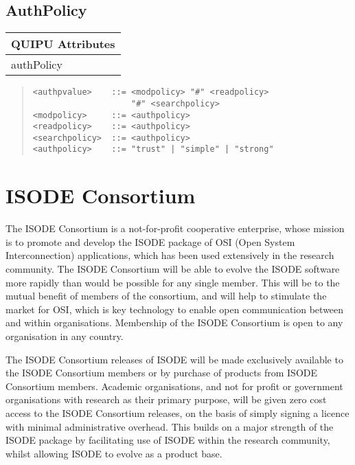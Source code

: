 \section{AuthPolicy}
\label{authpolicy}
\begin{center}\small
\begin{tabular}{|l|}\hline
QUIPU Attributes \\ \hline
	authPolicy\\
\hline
\end{tabular}
\end{center}
\begin{quote}\begin{verbatim}
<authpvalue>    ::= <modpolicy> "#" <readpolicy> 
                    "#" <searchpolicy>
<modpolicy>     ::= <authpolicy>
<readpolicy>    ::= <authpolicy>
<searchpolicy>  ::= <authpolicy>
<authpolicy>    ::= "trust" | "simple" | "strong"
\end{verbatim}\end{quote}



\chapter{ISODE Consortium}
\label{IC}

The ISODE Consortium is a not-for-profit cooperative enterprise, whose
mission is to promote and develop the ISODE package of OSI (Open
System Interconnection) applications, which has been used extensively
in the research community.  The ISODE Consortium will be able to
evolve the ISODE software more rapidly than would be possible for any
single member.  This will be to the mutual benefit of members of the
consortium, and will help to stimulate the market for OSI, which
is key technology to enable open communication between and within
organisations.  Membership of the ISODE Consortium is open to any
organisation in any country.

The ISODE Consortium releases of ISODE will be made exclusively
available to the ISODE Consortium members or by purchase of products
from ISODE Consortium members.  Academic organisations, and not for
profit or government organisations with research as their primary
purpose, will be given zero cost access to the ISODE Consortium releases,
on the basis of simply signing a licence with minimal administrative
overhead. This builds on a major strength of the ISODE package by
facilitating use of ISODE within the research community, whilst
allowing ISODE to evolve as a product base.

